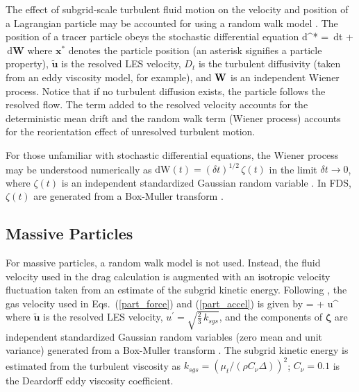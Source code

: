 The effect of subgrid-scale turbulent fluid motion on the velocity and position of a Lagrangian particle may be accounted for using a random walk model \cite{Raman:CF}.  The position of a tracer particle obeys the stochastic differential equation
\be
\mbox{d}^* =  \,\mbox{d}t +  \,\mbox{d}\mbox{\textbf{W}}
\ee
where $\mathbf{x}^*$ denotes the particle position (an asterisk signifies a particle property), $\tilde{\mathbf{u}}$ is the resolved LES velocity, $D_t$ is the turbulent diffusivity (taken from an eddy viscosity model, for example), and $\mbox{\textbf{W}}$ is an independent Wiener process.  Notice that if no turbulent diffusion exists, the particle follows the resolved flow.  The term added to the resolved velocity accounts for the deterministic mean drift and the random walk term (Wiener process) accounts for the reorientation effect of unresolved turbulent motion.

For those unfamiliar with stochastic differential equations, the Wiener process may be understood numerically as $\mbox{dW}(t) = (\delta t)^{1/2} \, \zeta(t)$ in the limit $\delta t \rightarrow 0$, where $\zeta(t)$ is an independent standardized Gaussian random variable \cite{Pope:2000}.  In FDS, $\zeta(t)$ are generated from a Box-Muller transform \cite{Box-Muller:1958}.

\subsection{Massive Particles}

For massive particles, a random walk model is not used.  Instead, the fluid velocity used in the drag calculation is augmented with an isotropic velocity fluctuation taken from an estimate of the subgrid kinetic energy.  Following \cite{Breuer:2012}, the gas velocity used in Eqs.~(\ref{part_force}) and (\ref{part_accel}) is given by
\be
{} =  + u^\prime \, {\bm \zeta}
\ee
where $\tilde{\mathbf{u}}$ is the resolved LES velocity, $u^\prime = \sqrt{\frac{2}{3}\,k_{sgs}}$, and the components of $\bm \zeta$ are independent standardized Gaussian random variables (zero mean and unit variance) generated from a Box-Muller transform \cite{Box-Muller:1958}.  The subgrid kinetic energy is estimated from the turbulent viscosity as $k_{sgs} = (\mu_t/(\rho C_{\nu} \Delta))^2$; $C_\nu = 0.1$ is the Deardorff eddy viscosity coefficient.



